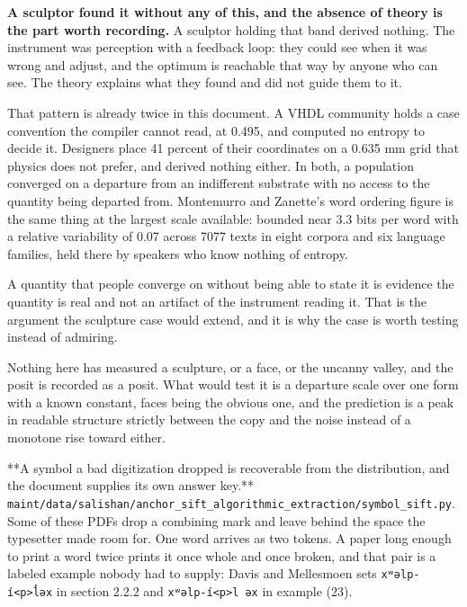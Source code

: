 \textbf{A sculptor found it without any of this, and the absence of theory is the part worth recording.} A sculptor holding that band derived nothing. The instrument was perception with a feedback loop: they could see when it was wrong and adjust, and the optimum is reachable that way by anyone who can see. The theory explains what they found and did not guide them to it.

That pattern is already twice in this document. A VHDL community holds a case convention the compiler cannot read, at 0.495, and computed no entropy to decide it. Designers place 41 percent of their coordinates on a 0.635 mm grid that physics does not prefer, and derived nothing either. In both, a population converged on a departure from an indifferent substrate with no access to the quantity being departed from. Montemurro and Zanette's word ordering figure is the same thing at the largest scale available: bounded near 3.3 bits per word with a relative variability of 0.07 across 7077 texts in eight corpora and six language families, held there by speakers who know nothing of entropy.

A quantity that people converge on without being able to state it is evidence the quantity is real and not an artifact of the instrument reading it. That is the argument the sculpture case would extend, and it is why the case is worth testing instead of admiring.

Nothing here has measured a sculpture, or a face, or the uncanny valley, and the posit is recorded as a posit. What would test it is a departure scale over one form with a known constant, faces being the obvious one, and the prediction is a peak in readable structure strictly between the copy and the noise instead of a monotone rise toward either.

**A symbol a bad digitization dropped is recoverable from the distribution, and the document supplies its own answer key.** \texttt{maint/\allowbreak{}data/\allowbreak{}salishan/\allowbreak{}anchor\_\allowbreak{}sift\_\allowbreak{}algorithmic\_\allowbreak{}extraction/\allowbreak{}symbol\_\allowbreak{}sift.\allowbreak{}py}. Some of these PDFs drop a combining mark and leave behind the space the typesetter made room for. One word arrives as two tokens. A paper long enough to print a word twice prints it once whole and once broken, and that pair is a labeled example nobody had to supply: Davis and Mellesmoen sets \texttt{xʷəlp-\allowbreak{}í<p>l̓əx} in section 2.2.2 and \texttt{xʷəlp-\allowbreak{}í<p>l əx} in example (23).

